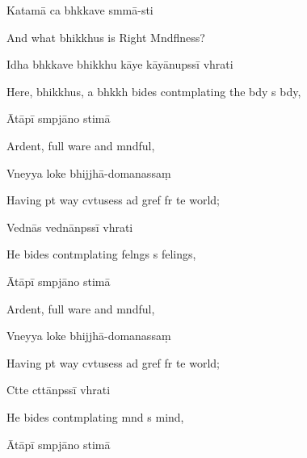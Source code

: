 Katamā ca bhkkave smmā-sti

\begin{english}
  And what bhikkhus is Right Mndflness?
\end{english}

Idha bhkkave bhikkhu kāye kāyānupssī vhrati

\begin{english}
  Here, bhikkhus, a bhkkh bides contmplating the bdy s  bdy,
\end{english}

Ātāpī smpjāno stimā

\begin{english}
  Ardent, full ware and mndful,
\end{english}

Vneyya loke bhijjhā-domanassaṃ

\begin{english}
  Having pt way cvtusess ad gref fr te world;
\end{english}

Vednās vednānpssī vhrati

\begin{english}
  He bides contmplating felngs s felings,
\end{english}

Ātāpī smpjāno stimā

\begin{english}
  Ardent, full ware and mndful,
\end{english}

Vneyya loke bhijjhā-domanassaṃ

\begin{english}
  Having pt way cvtusess ad gref fr te world;
\end{english}

Ctte cttānpssī vhrati

\begin{english}
  He bides contmplating mnd s mind,
\end{english}

Ātāpī smpjāno stimā

